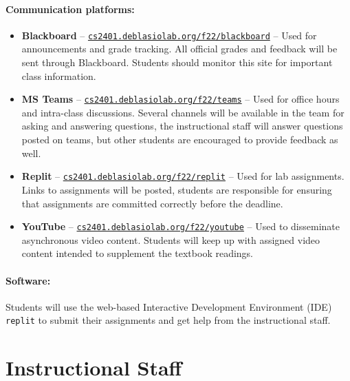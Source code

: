 \documentclass[12pt]{scrartcl}
\begin{document}
\paragraph{Communication platforms:}
\begin{itemize}
\item \textbf{Blackboard} -- \href{http://cs2401.deblasiolab.org/f22/blackboard}{\texttt{cs2401.deblasiolab.org/f22/blackboard}}  -- Used for announcements and grade tracking. All official grades and feedback will be sent through Blackboard. Students should monitor this site for important class information. 
\item \textbf{MS Teams} -- \href{http://cs2401.deblasiolab.org/f22/teams}{\texttt{cs2401.deblasiolab.org/f22/teams}}  -- Used for office hours and intra-class discussions. Several channels will be available in the team for asking and answering questions, the instructional staff will answer questions posted on teams, but other students are encouraged to provide feedback as well. 
\item \textbf{Replit} -- \href{http://cs2401.deblasiolab.org/f22/replit}{\texttt{cs2401.deblasiolab.org/f22/replit}}  -- Used for lab assignments. Links to assignments will be posted, students are responsible for ensuring that assignments are committed correctly before the deadline. 
\item \textbf{YouTube} -- \href{http://cs2401.deblasiolab.org/f22/youtube}{\texttt{cs2401.deblasiolab.org/f22/youtube}} -- Used to disseminate asynchronous video content. Students will keep up with assigned video content intended to supplement the textbook readings.
\end{itemize}

\paragraph{Software: } 
Students will use the web-based Interactive Development Environment (IDE) \texttt{replit} to submit their assignments and get help from the instructional staff. 

\section{Instructional Staff}
\end{document}
